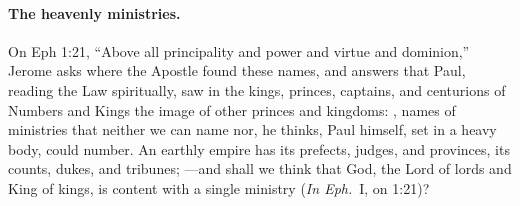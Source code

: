 \paragraph{The heavenly ministries.} On Eph 1:21, ``Above all principality
and power and virtue and dominion,'' Jerome asks where the Apostle found
these names, and answers that Paul, reading the Law spiritually, saw in
the kings, princes, captains, and centurions of Numbers and Kings the
image of other princes and kingdoms: , names of ministries that neither we can
name nor, he thinks, Paul himself, set in a heavy body, could number. An
earthly empire has its prefects, judges, and provinces, its counts,
dukes, and tribunes; ---and shall we think
that God, the Lord of lords and King of kings, is content with a single
ministry (\emph{In Eph.}\ I, on 1:21)?

